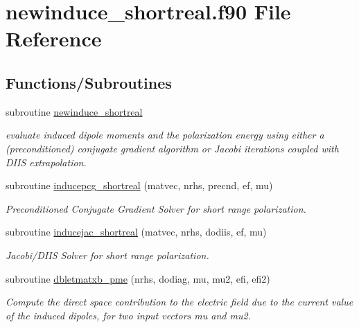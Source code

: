 \hypertarget{newinduce__shortreal_8f90}{\section{newinduce\-\_\-shortreal.\-f90 File Reference}
\label{newinduce__shortreal_8f90}
}
\subsection*{Functions/\-Subroutines}
\begin{DoxyCompactItemize}
\item 
subroutine \hyperlink{newinduce__shortreal_8f90_a3d01ff79142c61b9e7b9e04c8fcc48a2}{newinduce\-\_\-shortreal}
\begin{DoxyCompactList}\small\item\em evaluate induced dipole moments and the polarization energy using either a (preconditioned) conjugate gradient algorithm or Jacobi iterations coupled with D\-I\-I\-S extrapolation. \end{DoxyCompactList}\item 
subroutine \hyperlink{newinduce__shortreal_8f90_a41d7b71f3f49b4f99db271cf53ba6ea4}{inducepcg\-\_\-shortreal} (matvec, nrhs, precnd, ef, mu)
\begin{DoxyCompactList}\small\item\em Preconditioned Conjugate Gradient Solver for short range polarization. \end{DoxyCompactList}\item 
subroutine \hyperlink{newinduce__shortreal_8f90_a49fd4302db21c05b5d376203d08e8f53}{inducejac\-\_\-shortreal} (matvec, nrhs, dodiis, ef, mu)
\begin{DoxyCompactList}\small\item\em Jacobi/\-D\-I\-I\-S Solver for short range polarization. \end{DoxyCompactList}\item 
subroutine \hyperlink{newinduce__shortreal_8f90_a38e10e399e49e4c1601a82291ddab784}{dbletmatxb\-\_\-pme} (nrhs, dodiag, mu, mu2, efi, efi2)
\begin{DoxyCompactList}\small\item\em Compute the direct space contribution to the electric field due to the current value of the induced dipoles, for two input vectors mu and mu2. \end{DoxyCompactList}\end{DoxyCompactItemize}


